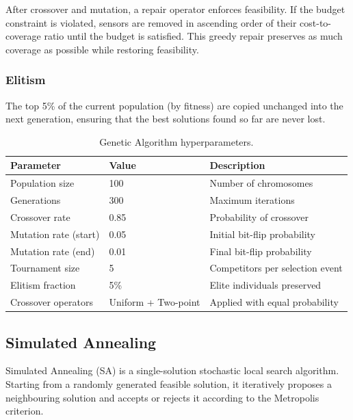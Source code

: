\documentclass[12pt,a4paper]{article}
\begin{document}
After crossover and mutation, a repair operator enforces feasibility.
If the budget constraint is violated, sensors are removed in ascending order of their cost-to-coverage ratio until the budget is satisfied.
This greedy repair preserves as much coverage as possible while restoring feasibility.

\subsubsection*{Elitism}

The top 5\% of the current population (by fitness) are copied unchanged into the next generation, ensuring that the best solutions found so far are never lost.

\begin{table}[H]
  \centering
  \caption{Genetic Algorithm hyperparameters.}
  \label{tab:ga_params}
  \begin{tabular}{lll}
    \toprule
    \textbf{Parameter} & \textbf{Value} & \textbf{Description} \\
    \midrule
    Population size       & 100          & Number of chromosomes \\
    Generations           & 300          & Maximum iterations \\
    Crossover rate        & 0.85         & Probability of crossover \\
    Mutation rate (start) & 0.05         & Initial bit-flip probability \\
    Mutation rate (end)   & 0.01         & Final bit-flip probability \\
    Tournament size       & 5            & Competitors per selection event \\
    Elitism fraction      & 5\%          & Elite individuals preserved \\
    Crossover operators   & Uniform + Two-point & Applied with equal probability \\
    \bottomrule
  \end{tabular}
\end{table}

\subsection{Simulated Annealing}

Simulated Annealing (SA) is a single-solution stochastic local search algorithm.
Starting from a randomly generated feasible solution, it iteratively proposes a neighbouring solution and accepts or rejects it according to the Metropolis criterion.
\end{document}
